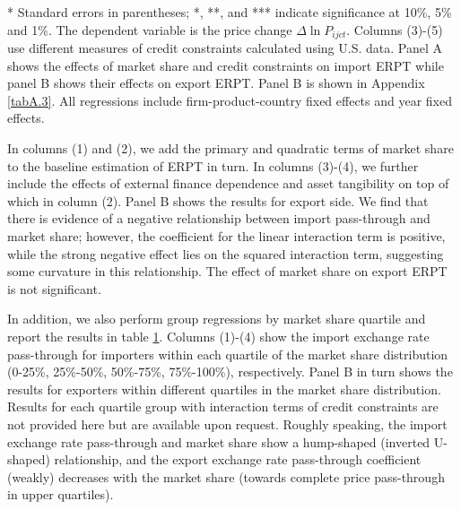\begin{table}[htbp]
\begin{threeparttable}
\begin{tabular}{lccccc}
			\bottomrule
		\end{tabular}
		\begin{tablenotes}
			\footnotesize
			\item[*] Standard errors in parentheses; *, **, and *** indicate significance at 10\%, 5\% and 1\%. The dependent variable is the price change $\Delta \ln P_{ijct}$. Columns (3)-(5) use different measures of credit constraints calculated using U.S. data. Panel A shows the effects of market share and credit constraints on import ERPT while panel B shows their effects on export ERPT. Panel B is shown in Appendix \ref{tabA.3}. All regressions include firm-product-country fixed effects and year fixed effects.
		\end{tablenotes}
	\end{threeparttable}
	\label{tab6.2}
\end{table}

In columns (1) and (2), we add the primary and quadratic terms of market share to the baseline estimation of ERPT in turn. In columns (3)-(4), we further include the effects of external finance dependence and asset tangibility on top of which in column (2). Panel B shows the results for export side. We find that there is evidence of a negative relationship between import pass-through and market share; however, the coefficient for the linear interaction term is positive, while the strong negative effect lies on the squared interaction term, suggesting some curvature in this relationship. The effect of market share on export ERPT is not significant. 

In addition, we also perform group regressions by market share quartile and report the results in table \ref{tab6.2}. Columns (1)-(4) show the import exchange rate pass-through for importers within each quartile of the market share distribution (0-25\%, 25\%-50\%, 50\%-75\%, 75\%-100\%), respectively. Panel B in turn shows the results for exporters within different quartiles in the market share distribution. Results for each quartile group with interaction terms of credit constraints are not provided here but are available upon request. Roughly speaking, the import exchange rate pass-through and market share show a hump-shaped (inverted U-shaped) relationship, and the export exchange rate pass-through coefficient (weakly) decreases with the market share (towards complete price pass-through in upper quartiles).

